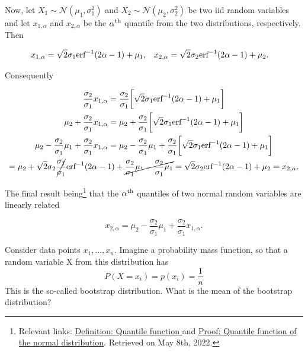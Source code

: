 \documentclass{homework}
\begin{document}
Now, let $X_1 \sim \mathcal{N}(\mu_1, \sigma_1^2)$ and $X_2 \sim \mathcal{N}(\mu_2, \sigma_2^2)$ be two iid random variables and let $x_{1,\alpha}$ and $x_{2,\alpha}$ be the $\alpha^{\textnormal{th}}$ quantile from the two distributions, respectively. Then

\begin{align*}
    x_{1,\alpha} & = \sqrt{2}\sigma_1 \textnormal{erf}^{-1}(2\alpha-1) + \mu_1, &  x_{2,\alpha} & = \sqrt{2}\sigma_2 \textnormal{erf}^{-1}(2\alpha-1) + \mu_2.
\end{align*}

Consequently

\begin{equation*}
\begin{gathered}
    \frac{\sigma_2}{\sigma_1}x_{1,\alpha}  =  \frac{\sigma_2}{\sigma_1} \bigg[ \sqrt{2}\sigma_1 \textnormal{erf}^{-1}(2\alpha-1) + \mu_1 \bigg] \\
    \mu_2 + \frac{\sigma_2}{\sigma_1}x_{1,\alpha} = \mu_2 + \frac{\sigma_2}{\sigma_1} \bigg[ \sqrt{2}\sigma_1 \textnormal{erf}^{-1}(2\alpha-1) + \mu_1 \bigg] \\
    \mu_2 - \frac{\sigma_2}{\sigma_1} \mu_1 + \frac{\sigma_2}{\sigma_1}x_{1,\alpha} = \mu_2 - \frac{\sigma_2}{\sigma_1} \mu_1 + \frac{\sigma_2}{\sigma_1} \bigg[ \sqrt{2}\sigma_1 \textnormal{erf}^{-1}(2\alpha-1) + \mu_1 \bigg] \\
    = \mu_2 + \sqrt{2} \sigma_2 \cancel{ \frac{\sigma_1}{\sigma_1}} \textnormal{erf}^{-1}(2\alpha-1) + \cancel{ \frac{\sigma_2}{\sigma_1} \mu_1 - \frac{\sigma_2}{\sigma_1} \mu_1} = \sqrt{2} \sigma_2 \textnormal{erf}^{-1}(2\alpha-1) + \mu_2 = x_{2,\alpha}. 
\end{gathered}
\end{equation*}

The final result being\footnote{Relevant links: \href{https://statproofbook.github.io/D/qf}{Definition: Quantile function
} and
\href{https://statproofbook.github.io/P/norm-qf.html}{Proof: Quantile function of the normal distribution}. Retrieved on May 8th, 2022.} that the $\alpha^{\textnormal{th}}$ quantiles of two normal random variables are linearly related 

$$
x_{2,\alpha} = \mu_{2} - \frac{\sigma_2}{\sigma_1}\mu_1 + \frac{\sigma_2}{\sigma_1}x_{1,\alpha}.  
$$

\begin{tcolorbox}[title=Question 8]
Consider data points $x_1,\ldots, x_n$. Imagine a probability mass function, so that a random variable X from this distribution has
$$ 
P(X = x_i) = p(x_i) = \frac{1}{n}
$$
This is the so-called bootstrap distribution. What is the mean of the bootstrap distribution?
\end{tcolorbox}
\end{document}
